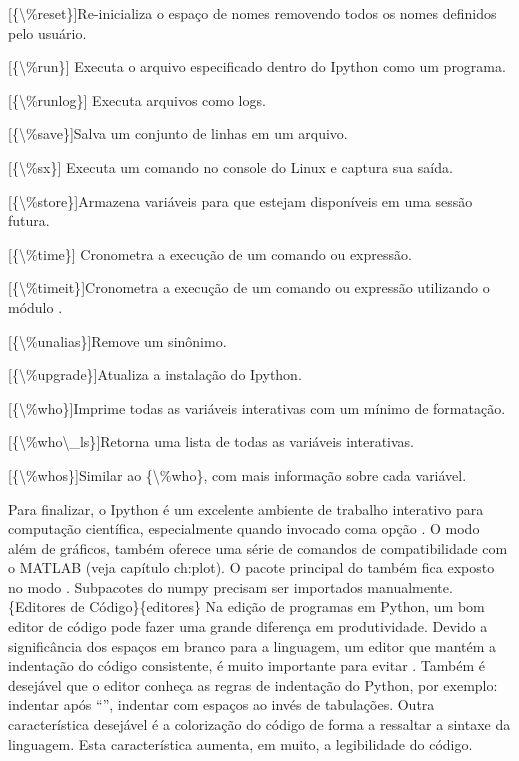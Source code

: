 \documentclass[a4paper,10pt,brazil]{sphinxmanual}
\begin{document}
\begin{description}
{[}\{\textbackslash{}\%reset\}{]}Re-inicializa o espaço de nomes removendo todos os
nomes definidos pelo usuário.

{[}\{\textbackslash{}\%run\}{]} Executa o arquivo especificado dentro do Ipython como um
programa.

{[}\{\textbackslash{}\%runlog\}{]} Executa arquivos como logs.

{[}\{\textbackslash{}\%save\}{]}Salva um conjunto de linhas em um arquivo.

{[}\{\textbackslash{}\%sx\}{]} Executa um comando no console do Linux e captura sua
saída.

{[}\{\textbackslash{}\%store\}{]}Armazena variáveis para que estejam disponíveis em uma
sessão futura.

{[}\{\textbackslash{}\%time\}{]} Cronometra a execução de um comando ou expressão.

{[}\{\textbackslash{}\%timeit\}{]}Cronometra a execução de um comando ou expressão
utilizando o módulo .

{[}\{\textbackslash{}\%unalias\}{]}Remove um sinônimo.

{[}\{\textbackslash{}\%upgrade\}{]}Atualiza a instalação do Ipython.

{[}\{\textbackslash{}\%who\}{]}Imprime todas as variáveis interativas com um mínimo de
formatação.

{[}\{\textbackslash{}\%who\textbackslash{}\_ls\}{]}Retorna uma lista de todas as variáveis
interativas.

{[}\{\textbackslash{}\%whos\}{]}Similar ao \{\textbackslash{}\%who\}, com mais informação sobre cada
variável.

\end{description}

Para finalizar, o Ipython é um excelente ambiente de trabalho
interativo para computação científica, especialmente quando
invocado coma opção . O modo  além de gráficos,
também oferece uma série de comandos de compatibilidade com o
MATLAB (veja capítulo ch:plot). O pacote principal do 
também fica exposto no modo . Subpacotes do numpy precisam
ser importados manualmente. \{Editores de Código\}\{editores\} Na
edição de programas em Python, um bom editor de código pode fazer
uma grande diferença em produtividade. Devido a significância dos
espaços em branco para a linguagem, um editor que mantém a
indentação do código consistente, é muito importante para evitar
. Também é desejável que o editor conheça as regras de
indentação do Python, por exemplo: indentar após ``\code{:}'', indentar
com espaços ao invés de tabulações. Outra característica desejável
é a colorização do código de forma a ressaltar a sintaxe da
linguagem. Esta característica aumenta, em muito, a legibilidade do
código.
\end{document}
